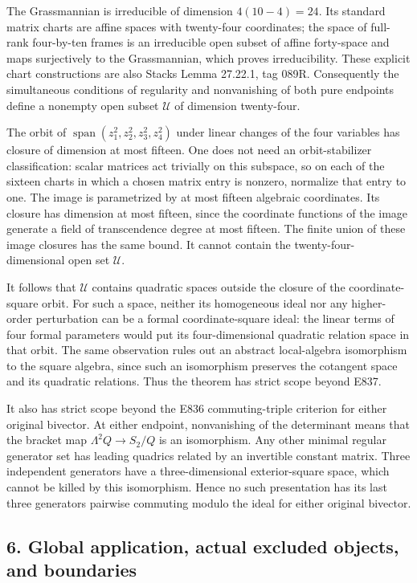 The Grassmannian is irreducible of dimension \(4(10-4)=24\). Its
standard matrix charts are affine spaces with twenty-four coordinates;
the space of full-rank four-by-ten frames is an irreducible open subset
of affine forty-space and maps surjectively to the Grassmannian, which
proves irreducibility. These explicit chart constructions are also
Stacks Lemma 27.22.1, tag 089R. Consequently the simultaneous conditions
of regularity and nonvanishing of both pure endpoints define a nonempty
open subset \(\mathcal U\) of dimension twenty-four.

The orbit of \(\operatorname{span}(z_1^2,z_2^2,z_3^2,z_4^2)\) under
linear changes of the four variables has closure of dimension at most
fifteen. One does not need an orbit-stabilizer classification: scalar
matrices act trivially on this subspace, so on each of the sixteen
charts in which a chosen matrix entry is nonzero, normalize that entry
to one. The image is parametrized by at most fifteen algebraic
coordinates. Its closure has dimension at most fifteen, since the
coordinate functions of the image generate a field of transcendence
degree at most fifteen. The finite union of these image closures has the
same bound. It cannot contain the twenty-four-dimensional open set
\(\mathcal U\).

It follows that \(\mathcal U\) contains quadratic spaces outside the
closure of the coordinate-square orbit. For such a space, neither its
homogeneous ideal nor any higher-order perturbation can be a formal
coordinate-square ideal: the linear terms of four formal parameters
would put its four-dimensional quadratic relation space in that orbit.
The same observation rules out an abstract local-algebra isomorphism to
the square algebra, since such an isomorphism preserves the cotangent
space and its quadratic relations. Thus the theorem has strict scope
beyond E837.

It also has strict scope beyond the E836 commuting-triple criterion for
either original bivector. At either endpoint, nonvanishing of the
determinant means that the bracket map \(\Lambda^2Q\to S_2/Q\) is an
isomorphism. Any other minimal regular generator set has leading
quadrics related by an invertible constant matrix. Three independent
generators have a three-dimensional exterior-square space, which cannot
be killed by this isomorphism. Hence no such presentation has its last
three generators pairwise commuting modulo the ideal for either original
bivector.

\subsection{6. Global application, actual excluded objects, and
boundaries}\label{global-application-actual-excluded-objects-and-boundaries}

